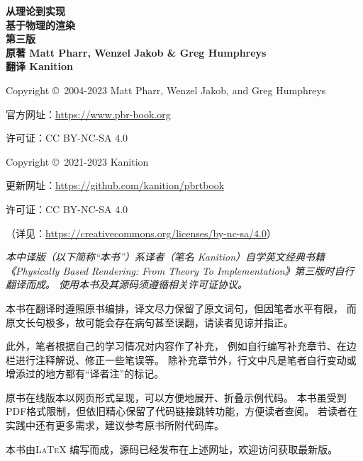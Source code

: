 \noindent \textbf{\LARGE 从理论到实现}\vspace{8pt}\\
\noindent \textbf{\Huge 基于物理的渲染}\vspace{8pt}\\
\noindent \textbf{\large 第三版}\vspace{8pt}\\
\noindent \textbf{\large 原著 \quad Matt Pharr, Wenzel Jakob \& Greg Humphreys}\vspace{5pt}\\
\noindent \textbf{\large 翻译 \quad Kanition}\vspace{16pt}\\


\noindent Copyright \copyright\ 2004-2023 Matt Pharr, Wenzel Jakob, and Greg Humphreys

\noindent 官方网址：\url{https://www.pbr-book.org}

\noindent 许可证：CC BY-NC-SA 4.0\\


\noindent Copyright \copyright\ 2021-2023 Kanition

\noindent 更新网址：\url{https://github.com/kanition/pbrtbook}

\noindent 许可证：CC BY-NC-SA 4.0

    {\small（详见：\url{https://creativecommons.org/licenses/by-nc-sa/4.0}）}

    {\ttfamily\small}

{\itshape
本中译版（以下简称“本书”）系译者（笔名 Kanition）自学英文经典书籍
《Physically Based Rendering: From Theory To Implementation》第三版时自行翻译而成。
使用本书及其源码须遵循相关许可证协议。

本书在翻译时遵照原书编排，译文尽力保留了原文词句，但因笔者水平有限，
而原文长句极多，故可能会存在病句甚至误翻，请读者见谅并指正。

此外，笔者根据自己的学习情况对内容作了补充，
例如自行编写补充章节、在边栏进行注释解说、修正一些笔误等。
除补充章节外，行文中凡是笔者自行变动或增添过的地方都有“译者注”的标记。

原书在线版本以网页形式呈现，可以方便地展开、折叠示例代码。
本书虽受到PDF格式限制，但依旧精心保留了代码链接跳转功能，方便读者查阅。
若读者在实践中还有更多需求，建议参考原书所附代码库。

本书由{\scshape \LaTeX} 编写而成，源码已经发布在上述网址，欢迎访问获取最新版。

{\color{red}}
}